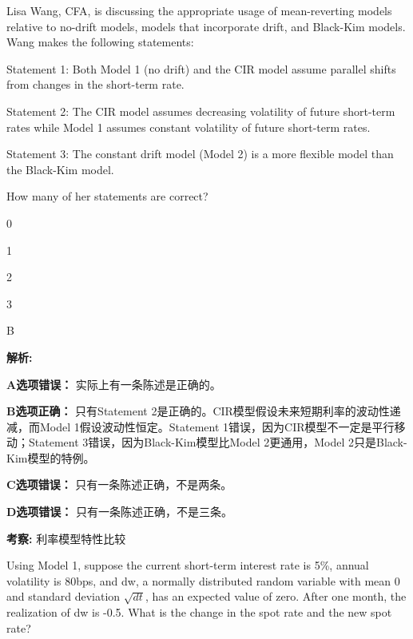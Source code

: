 \documentclass{article}
\newcounter{question} %
\newenvironment{explanation}
{\textbf{解析:}\par}
{\par}
\newcommand{\checklist}[1]{
    \textbf{考察:} #1 \par %
    \addcontentsline{toc}{subsection}{题号\thequestion 考察: #1} %
    \vspace{2em} %
}
\begin{document}
\begin{question}
    Lisa Wang, CFA, is discussing the appropriate usage of mean-reverting models relative to no-drift models, models that incorporate drift, and Black-Kim models. Wang makes the following statements: 

    Statement 1: Both Model 1 (no drift) and the CIR model assume parallel shifts from changes in the short-term rate. 

    Statement 2: The CIR model assumes decreasing volatility of future short-term rates while Model 1 assumes constant volatility of future short-term rates. 

    Statement 3: The constant drift model (Model 2) is a more flexible model than the Black-Kim model. 

    How many of her statements are correct?
\end{question}

\begin{choices}
    \item 0
    \item 1
    \item 2
    \item 3
\end{choices}

\begin{correctanswer}
    B
\end{correctanswer}

\begin{explanation}
    \textbf{A选项错误：} 实际上有一条陈述是正确的。

    \textbf{B选项正确：} 只有Statement 2是正确的。CIR模型假设未来短期利率的波动性递减，而Model 1假设波动性恒定。Statement 1错误，因为CIR模型不一定是平行移动；Statement 3错误，因为Black-Kim模型比Model 2更通用，Model 2只是Black-Kim模型的特例。

    \textbf{C选项错误：} 只有一条陈述正确，不是两条。

    \textbf{D选项错误：} 只有一条陈述正确，不是三条。
\end{explanation}
\checklist{利率模型特性比较}


\begin{question}
    Using Model 1, suppose the current short-term interest rate is 5\%, annual volatility is 80bps, and dw, a normally distributed random variable with mean 0 and standard deviation \(\sqrt{dt}\), has an expected value of zero. After one month, the realization of dw is -0.5. What is the change in the spot rate and the new spot rate?
\end{question}
\end{document}

